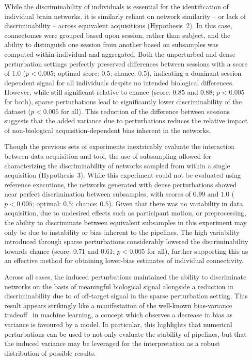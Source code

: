 \documentclass[fleqn,10pt]{SelfArx} %
\begin{document}
While the discriminability of individuals is essential for the identification of individual brain networks, it is
similarly reliant on network similarity – or lack of discriminability – across equivalent acquisitions (Hypothesis~2).
In this case, connectomes were grouped based upon session, rather than subject, and the ability to distinguish one
session from another based on subsamples was computed within-individual and aggregated. Both the unperturbed and dense
perturbation settings perfectly preserved differences between sessions with a score of $1.0$ ($p < 0.005$; optimal
score: $0.5$; chance: $0.5$), indicating a dominant session-dependent signal for all individuals despite no intended
biological differences. However, while still significant relative to chance (score: $0.85$ and $0.88$; $p < 0.005$ for
both), sparse perturbations lead to significantly lower discriminability of the dataset ($p < 0.005$ for all).
This reduction of the difference between sessions suggests that the added variance due to perturbations
reduces the relative impact of non-biological acquisition-dependent bias inherent in the networks.

Though the previous sets of experiments inextricably evaluate the interaction between data acquisition and tool,
the use of subsampling allowed for characterizing the discriminability of networks sampled from within a single
acquisition (Hypothesis~3). While this experiment could not be evaluated using reference executions, the networks
generated with dense perturbations showed near perfect discrimination between subsamples, with scores of $0.99$ and
$1.0$ ($p < 0.005$; optimal: $0.5$; chance: $0.5$). Given that there was no variability in data acquisition, due to
undesired effects such as participant motion, or preprocessing, the ability to discriminate between equivalent
subsamples in this experiment may only be due to instability or bias inherent to the pipelines. The high variability
introduced through sparse perturbations considerably lowered the discriminability towards chance (score:
$0.71$ and $0.61$; $p < 0.005$ for all), further supporting this as an effective method for obtaining lower-bias
estimates of individual connectivity.

Across all cases, the induced perturbations maintained the ability to discriminate networks on the basis of
meaningful biological signal alongside a reduction in discriminability due to of off-target signal in the sparse
perturbation setting. This result appears strikingly like a manifestation of the well-known bias-variance
tradeoff~\cite{geman1992neural} in machine learning, a concept which observes a decrease in bias as variance is
favoured by a model. In particular, this highlights that numerical perturbations can be used to not only evaluate the
stability of pipelines, but that the induced variance may be leveraged for the interpretation as a robust distribution
of possible results.
\end{document}
